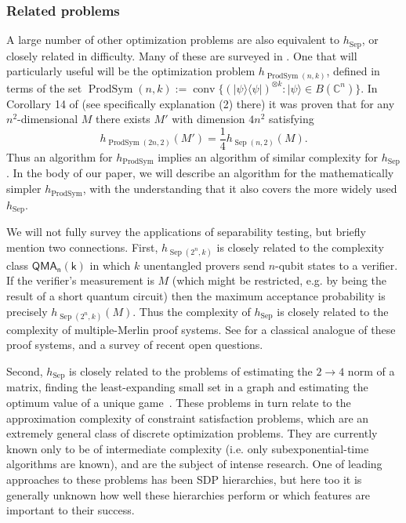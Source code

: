 \documentclass[aps,pra,notitlepage,preprintnumbers,11pt,tightenlines]{revtex4-1}
\newcommand{\bra}[1]{\langle #1 |}
\newcommand{\ket}[1]{| #1 \rangle}
\newcommand{\bbC}{\mathbb{C}}
\newcommand{\ot}{\otimes}
\newcommand{\be}{\begin{equation}}
\newcommand{\ee}{\end{equation}}
\newcommand{\ra}{\to}
\newcommand{\proj}[1]{\ket{#1} \bra{#1}}
\DeclareMathOperator{\ProdSym}{ProdSym}
\DeclareMathOperator{\Sep}{Sep}
\DeclareMathOperator{\conv}{conv}
\begin{document}
\subsubsection{Related problems}\label{sec:related}
A large number of other optimization problems are also equivalent
to $h_{\Sep}$, or closely related in difficulty.  Many of these are
surveyed in \cite{HM13}.  One that will particularly useful will be
the optimization problem $h_{\ProdSym(n,k)}$, defined in terms of the set
$\ProdSym(n,k) := \conv\{(\proj{\psi})^{\ot k} : \ket\psi\in
B(\bbC^n)\}$.  In Corollary 14 of \cite{HM13} (see specifically explanation
(2) there) it was proven that for any $n^2$-dimensional $M$ there exists
$M'$ with dimension $4n^2$ satisfying
\be  h_{\ProdSym(2n,2)}(M') = \frac{1}{4} h_{\Sep(n,2)}(M).\ee
Thus an algorithm for $h_{\ProdSym}$ implies an algorithm of similar
complexity for $h_{\Sep}$.   In the body of our paper, we will
describe an algorithm for the mathematically simpler $h_{\ProdSym}$,
with the understanding that it also covers the more widely used
$h_{\Sep}$.

We will not fully survey the applications of separability testing, but
briefly mention two connections.  First, $h_{\Sep(2^n,k)}$ is closely related
to the complexity class $\mathsf{QMA_n(k)}$ in which $k$ unentangled provers
send $n$-qubit states to a verifier.  If the verifier's measurement is
$M$ (which might be restricted, e.g. by being the result of a short
quantum circuit) then the maximum acceptance probability is precisely
$h_{\Sep(2^n,k)}(M)$.  Thus the complexity of $h_{\Sep}$ is closely
related to the complexity of multiple-Merlin proof systems.  See
\cite{AMM} for a classical analogue of these proof systems, and a
survey of recent open questions.

Second, $h_{\Sep}$ is closely related to the  problems of estimating the $2\ra 4$ norm
of a matrix, finding the least-expanding small set in a graph and
estimating the optimum value of a unique game~\cite{BBHKSZ12}. These
problems in turn relate to the approximation complexity of constraint
satisfaction problems, which are an extremely general class of
discrete optimization problems.  They are
currently known only to be of intermediate complexity
(i.e. only subexponential-time algorithms are known), and are the subject of intense
research.  One of leading approaches to these problems has been SDP
hierarchies, but here too it is generally unknown how well these
hierarchies perform or which features are important to their success.
\end{document}
